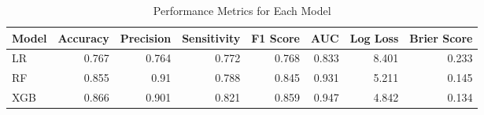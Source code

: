 \begin{table}[H]\centering
\caption{Performance Metrics for Each Model}
\label{Table 3 :performance_metrics}
\begin{tabular}{lrrrrrrr}
\toprule
Model & Accuracy & Precision & Sensitivity & F1 Score & AUC & Log Loss & Brier Score \\
\midrule
LR & 0.767 & 0.764 & 0.772 & 0.768 & 0.833 & 8.401 & 0.233 \\
RF & 0.855 & 0.91 & 0.788 & 0.845 & 0.931 & 5.211 & 0.145 \\
XGB & 0.866 & 0.901 & 0.821 & 0.859 & 0.947 & 4.842 & 0.134 \\
\bottomrule
\end{tabular}
\end{table}
